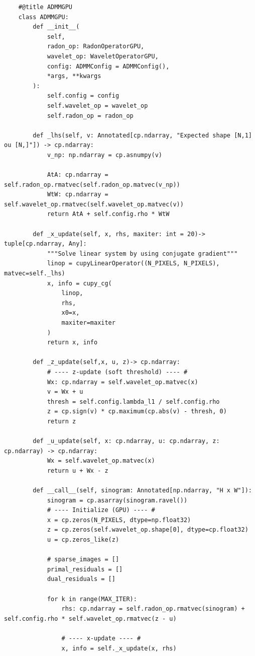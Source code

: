 \begin{verbatim}
    #@title ADMMGPU
    class ADMMGPU:
        def __init__(
            self,
            radon_op: RadonOperatorGPU,
            wavelet_op: WaveletOperatorGPU,
            config: ADMMConfig = ADMMConfig(),
            *args, **kwargs
        ):
            self.config = config
            self.wavelet_op = wavelet_op
            self.radon_op = radon_op

        def _lhs(self, v: Annotated[cp.ndarray, "Expected shape [N,1] ou [N,]"]) -> cp.ndarray:
            v_np: np.ndarray = cp.asnumpy(v)

            AtA: cp.ndarray = self.radon_op.rmatvec(self.radon_op.matvec(v_np))
            WtW: cp.ndarray = self.wavelet_op.rmatvec(self.wavelet_op.matvec(v))
            return AtA + self.config.rho * WtW

        def _x_update(self, x, rhs, maxiter: int = 20)-> tuple[cp.ndarray, Any]:
            """Solve linear system by using conjugate gradient"""
            linop = cupyLinearOperator((N_PIXELS, N_PIXELS), matvec=self._lhs)
            x, info = cupy_cg(
                linop,
                rhs,
                x0=x,
                maxiter=maxiter
            )
            return x, info

        def _z_update(self,x, u, z)-> cp.ndarray:
            # ---- z-update (soft threshold) ---- #
            Wx: cp.ndarray = self.wavelet_op.matvec(x)
            v = Wx + u
            thresh = self.config.lambda_l1 / self.config.rho
            z = cp.sign(v) * cp.maximum(cp.abs(v) - thresh, 0)
            return z

        def _u_update(self, x: cp.ndarray, u: cp.ndarray, z: cp.ndarray) -> cp.ndarray:
            Wx = self.wavelet_op.matvec(x)
            return u + Wx - z

        def __call__(self, sinogram: Annotated[np.ndarray, "H x W"]):
            sinogram = cp.asarray(sinogram.ravel())
            # ---- Initialize (GPU) ---- #
            x = cp.zeros(N_PIXELS, dtype=np.float32)
            z = cp.zeros(self.wavelet_op.shape[0], dtype=cp.float32)
            u = cp.zeros_like(z)

            # sparse_images = []
            primal_residuals = []
            dual_residuals = []

            for k in range(MAX_ITER):
                rhs: cp.ndarray = self.radon_op.rmatvec(sinogram) + self.config.rho * self.wavelet_op.rmatvec(z - u)

                # ---- x-update ---- #
                x, info = self._x_update(x, rhs)


\end{verbatim}
